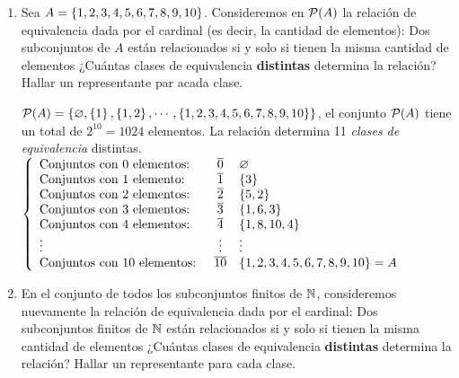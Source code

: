 \documentclass[12pt,a4paper, spanish]{article}
\begin{document}
\ejercicio
\begin{enumerate}[label=\roman*)]
	\item
	      Sea $A = \set{1, 2, 3, 4, 5, 6, 7, 8, 9, 10}$. Consideremos en $\partes(A)$ la relación de equivalencia dada
	      por el cardinal (es decir, la cantidad de elementos): Dos subconjuntos de $A$ están relacionados si y solo si tienen la misma cantidad
	      de elementos ¿Cuántas clases de equivalencia \textbf{distintas} determina la relación? Hallar un representante par acada clase.\\

	      \separadorCorto

	      $\partes(A) = \set{\vacio, \set{1}, \set{1,2}, \cdots, \set{1, 2, 3, 4, 5, 6, 7, 8, 9, 10}}$, el conjunto $\partes(A)$ tiene un total de
	      $2^{10} = 1024$ elementos. La relación determina 11 \textit{clases de equivalencia} distintas.\\
	      $\llave{lcl}{
			      \text{Conjuntos con 0 elementos: } & \clase{0}  & \vacio\\
			      \text{Conjuntos con 1 elemento: } & \clase{1} & \set{3}\\
			      \text{Conjuntos con 2 elementos: }& \clase{2} & \set{5,2}\\
			      \text{Conjuntos con 3 elementos: }& \clase{3} & \set{1,6, 3}\\
			      \text{Conjuntos con 4 elementos: }& \clase{4} & \set{1,8, 10,4}\\
			      \vdots                            &\vdots  & \vdots\\
			      \text{Conjuntos con 10 elementos: } & \clase{10} & \set{1,2,3,4,5,6,7,8,9,10} = A\\
		      }$

	\item
	      En el conjunto de todos los subconjuntos finitos de $\naturales$, consideremos nuevamente la relación de equivalencia dada por el cardinal: Dos subconjuntos finitos
	      de $\naturales$ están relacionados si y solo si tienen la misma cantidad de elementos ¿Cuántas clases de equivalencia \textbf{distintas} determina la relación?
	      Hallar un representante para cada clase.\\

	      \separadorCorto


\end{enumerate}
\end{document}
